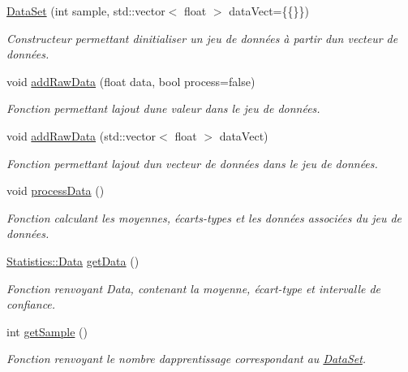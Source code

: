 \begin{DoxyCompactItemize}
\item 
\hyperlink{classDataSet_ab45c95dc19f12a9217c0f3da7ac92b6a}{Data\+Set} (int sample, std\+::vector$<$ float $>$ data\+Vect=\{\{\}\})
\begin{DoxyCompactList}\small\item\em Constructeur permettant d\textquotesingle{}initialiser un jeu de données à partir d\textquotesingle{}un vecteur de données. \end{DoxyCompactList}\item 
void \hyperlink{classDataSet_ac2453c8cd424ed33b941363a45c009f8}{add\+Raw\+Data} (float data, bool process=false)
\begin{DoxyCompactList}\small\item\em Fonction permettant l\textquotesingle{}ajout d\textquotesingle{}une valeur dans le jeu de données. \end{DoxyCompactList}\item 
void \hyperlink{classDataSet_a71cfe353100966c9bdfb1f6880075691}{add\+Raw\+Data} (std\+::vector$<$ float $>$ data\+Vect)
\begin{DoxyCompactList}\small\item\em Fonction permettant l\textquotesingle{}ajout d\textquotesingle{}un vecteur de données dans le jeu de données. \end{DoxyCompactList}\item 
void \hyperlink{classDataSet_a6e174dbffadb1a262c6cc92781d0bd12}{process\+Data} ()
\begin{DoxyCompactList}\small\item\em Fonction calculant les moyennes, écarts-\/types et les données associées du jeu de données. \end{DoxyCompactList}\item 
\hyperlink{structStatistics_1_1Data}{Statistics\+::\+Data} \hyperlink{classDataSet_af646e5b745734c1b18f2e90117e1d3c1}{get\+Data} ()
\begin{DoxyCompactList}\small\item\em Fonction renvoyant Data, contenant la moyenne, écart-\/type et intervalle de confiance. \end{DoxyCompactList}\item 
int \hyperlink{classDataSet_a29e3936319d5b2fda4f74b033c556766}{get\+Sample} ()
\begin{DoxyCompactList}\small\item\em Fonction renvoyant le nombre d\textquotesingle{}apprentissage correspondant au \hyperlink{classDataSet}{Data\+Set}. \end{DoxyCompactList}\end{DoxyCompactItemize}
